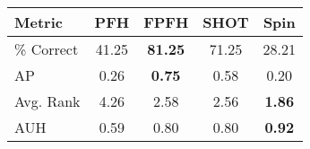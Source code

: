 \begin{tabular}{ | l || c | c | c | c | }
\hline
Metric & PFH & FPFH & SHOT & Spin \\
\hline
 \% Correct & 41.25 & \bf 81.25 & 71.25 & 28.21 \\
AP & 0.26 & \bf 0.75 & 0.58 & 0.20 \\
Avg. Rank & 4.26 & 2.58 & 2.56 & \bf 1.86 \\
AUH & 0.59 & 0.80 & 0.80 & \bf 0.92 \\
\hline
\end{tabular}